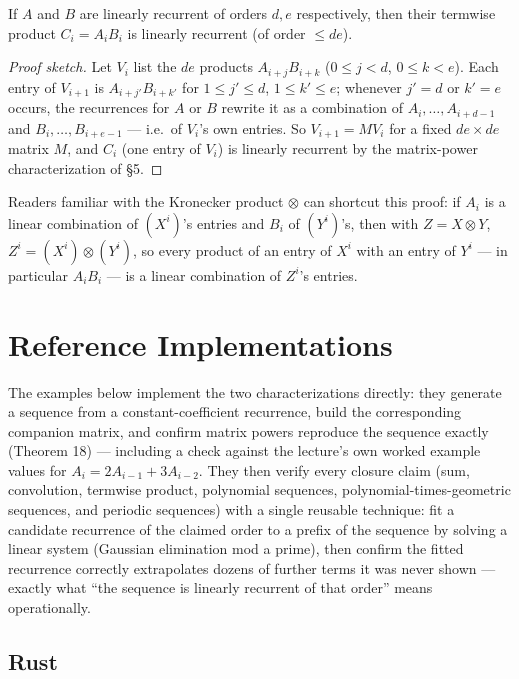 \documentclass[11pt]{article}
\begin{document}
\begin{theorembox}
If $A$ and $B$ are linearly recurrent of orders $d,e$ respectively, then
their termwise product $C_i=A_iB_i$ is linearly recurrent (of order
$\le de$).
\end{theorembox}
\begin{proof}[Proof sketch]
Let $V_i$ list the $de$ products $A_{i+j}B_{i+k}$ ($0\le j<d$,
$0\le k<e$). Each entry of $V_{i+1}$ is $A_{i+j'}B_{i+k'}$ for
$1\le j'\le d$, $1\le k'\le e$; whenever $j'=d$ or $k'=e$ occurs, the
recurrences for $A$ or $B$ rewrite it as a combination of
$A_i,\ldots,A_{i+d-1}$ and $B_i,\ldots,B_{i+e-1}$ --- i.e.\ of $V_i$'s
own entries. So $V_{i+1}=MV_i$ for a fixed $de\times de$ matrix $M$, and
$C_i$ (one entry of $V_i$) is linearly recurrent by the matrix-power
characterization of \S5.
\end{proof}

\begin{notebox}
Readers familiar with the Kronecker product $\otimes$ can shortcut this
proof: if $A_i$ is a linear combination of $(X^i)$'s entries and $B_i$ of
$(Y^i)$'s, then with $Z=X\otimes Y$, $Z^i=(X^i)\otimes(Y^i)$, so every
product of an entry of $X^i$ with an entry of $Y^i$ --- in particular
$A_iB_i$ --- is a linear combination of $Z^i$'s entries.
\end{notebox}

\section{Reference Implementations}
The examples below implement the two characterizations directly: they
generate a sequence from a constant-coefficient recurrence, build the
corresponding companion matrix, and confirm matrix powers reproduce the
sequence exactly (Theorem 18) --- including a check against the
lecture's own worked example values for $A_i=2A_{i-1}+3A_{i-2}$. They
then verify every closure claim (sum, convolution, termwise product,
polynomial sequences, polynomial-times-geometric sequences, and periodic
sequences) with a single reusable technique: fit a candidate recurrence
of the claimed order to a prefix of the sequence by solving a linear
system (Gaussian elimination mod a prime), then confirm the fitted
recurrence correctly extrapolates dozens of further terms it was never
shown --- exactly what ``the sequence is linearly recurrent of that
order'' means operationally.

\codenote
\subsection{Rust}
\end{document}
